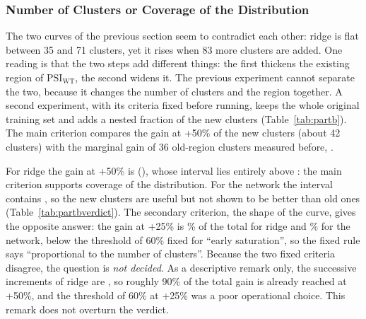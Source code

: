 \begin{table}[htbp]
  \centering
  \caption{Pre-registered verdicts of P1 and P0}\label{tab:verdict}
  
\end{table}

\begin{table}[htbp]
  \centering
  \caption{Cells of the benchmark peptides and of the 85 peptides added by relaxing the threshold}\label{tab:newgroup}
  
\end{table}

\subsubsection{Number of Clusters or Coverage of the Distribution}\label{sec:res-partb}
The two curves of the previous section seem to contradict each other: ridge is flat between 35 and 71
clusters, yet it rises when 83 more clusters are added. One reading is that the two steps add different things:
the first thickens the existing region of $\mathrm{PSI}_{\mathrm{WT}}$, the second widens it. The previous experiment
cannot separate the two, because it changes the number of clusters and the region together. A second
experiment, with its criteria fixed before running, keeps the whole original training set and adds a
nested fraction of the new clusters (Table~\ref{tab:partb}). The main criterion compares the gain at +50\% of the new
clusters (about 42 clusters) with the marginal gain of 36 old-region clusters measured before, \nBaseMarginal{}.

\begin{table}[htbp]
  \centering
  \caption{Gain over the benchmark training set when a fraction of the new clusters is added}\label{tab:partb}
  
\end{table}

For ridge the gain at +50\% is \nBFiftyRidge{} (\nBFiftyRidgeCI{}), whose interval lies entirely above \nBaseMarginal{}:
the main criterion supports coverage of the distribution. For the network the interval contains \nBaseMarginal{}, so the new
clusters are useful but not shown to be better than old ones (Table~\ref{tab:partbverdict}). The secondary
criterion, the shape of the curve, gives the opposite answer: the gain at +25\% is \nBFracRidge\% of the total
for ridge and \nBFracGate\% for the network, below the threshold of 60\% fixed for ``early saturation'', so the
fixed rule says ``proportional to the number of clusters''. Because the two fixed criteria disagree, the
question is \emph{not decided}. As a descriptive remark only, the successive increments of ridge are
\nBStepsRidge, so roughly 90\% of the total gain is already reached at +50\%, and the threshold of 60\% at +25\% was a
poor operational choice. This remark does not overturn the verdict.

